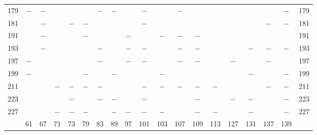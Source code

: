 \begin{center}
\begin{tabular}{r|c|c|c|c|c|c|c|c|c|c|c|c|c|c|c|c|c|r}
179 & $-$ & $-$ &  &  &  & $-$ & $-$ &  & $-$ &  & $-$ &  &  &  &  &  & $-$ & 179\\
181 &  & $-$ &  & $-$ & $-$ &  &  &  & $-$ &  &  &  &  &  &  & $-$ & $-$ & 181\\
191 &  & $-$ &  &  & $-$ &  &  & $-$ &  & $-$ & $-$ & $-$ &  &  &  &  &  & 191\\
193 &  & $-$ &  &  &  & $-$ &  & $-$ & $-$ &  & $-$ & $-$ &  &  & $-$ & $-$ & $-$ & 193\\
197 & $-$ &  &  &  &  & $-$ &  & $-$ & $-$ &  & $-$ & $-$ &  & $-$ &  & $-$ &  & 197\\
199 & $-$ &  &  &  & $-$ &  & $-$ &  &  & $-$ &  &  &  &  & $-$ &  & $-$ & 199\\
211 &  &  & $-$ & $-$ & $-$ & $-$ &  &  & $-$ & $-$ & $-$ & $-$ & $-$ &  &  & $-$ & $-$ & 211\\
223 &  &  &  & $-$ &  & $-$ & $-$ &  & $-$ &  &  & $-$ &  & $-$ & $-$ &  & $-$ & 223\\
227 &  &  & $-$ & $-$ & $-$ &  & $-$ & $-$ & $-$ & $-$ &  & $-$ & $-$ &  & $-$ &  & $-$ & 227\\
\hline
 & 61 & 67 & 71 & 73 & 79 & 83 & 89 & 97 & 101 & 103 & 107 & 109 & 113 & 127 & 131 & 137 & 139 & \\
\hline
\end{tabular}\endgroup\end{center}


